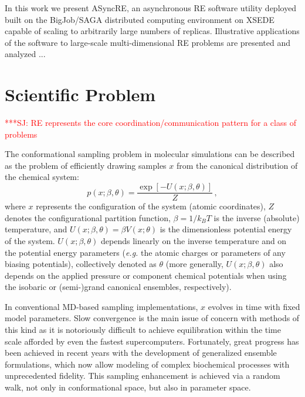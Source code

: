 \documentclass{sig-alternate}
\newcommand{\jhanote}[1]{ {\textcolor{red} { ***SJ: #1 }}}
\newcommand{\jhanote}[1]{}
\begin{document}
In this work we present ASyncRE, an asynchronous RE software utility
deployed built on the BigJob/SAGA distributed computing environment on
XSEDE capable of scaling to arbitrarily large numbers of
replicas. Illustrative applications of the software to large-scale
multi-dimensional RE problems are presented and analyzed ...

\section{Scientific Problem}\label{sec:requirements}

\jhanote{RE represents the core coordination/communication pattern for
  a class of problems} 

The conformational sampling problem in molecular simulations can be described 
as the problem of efficiently drawing samples $x$ from the canonical 
distribution of the chemical system:
\begin{equation}
p(x;\beta,\theta) = \frac{\exp[-U(x;\beta,\theta)]}{Z} \, ,
\end{equation}
where $x$ represents the configuration of the system (atomic coordinates), $Z$ 
denotes the configurational partition function, $\beta=1/k_B T$ is the inverse 
(absolute) temperature, and $U(x;\beta,\theta)=\beta V(x;\theta)$ is the 
dimensionless potential energy of the system.  $U(x;\beta,\theta)$ depends 
linearly on the inverse temperature and on the potential energy parameters 
({\em e.g.} the atomic charges or parameters of any biasing potentials), 
collectively denoted as $\theta$ (more generally, $U(x;\beta,\theta)$ also 
depends on the applied pressure or component chemical potentials when using 
the isobaric or (semi-)grand canonical ensembles, respectively).

In conventional MD-based sampling implementations, $x$ evolves in time with 
fixed model parameters. Slow convergence is the main issue of concern with 
methods of this kind as it is notoriously difficult to achieve equilibration 
within the time scale afforded by even the fastest supercomputers. Fortunately,
great progress has been achieved in recent years with the development of 
generalized ensemble formulations, which now allow modeling of complex 
biochemical processes with unprecedented fidelity. This sampling enhancement is
achieved via a random walk, not only in conformational space, but also in 
parameter space.
\end{document}
